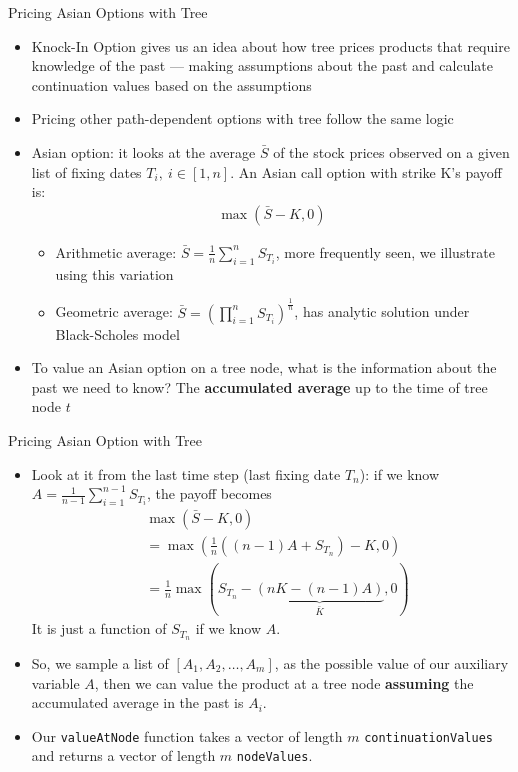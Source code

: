 \begin{frame}{Pricing Asian Options with Tree}
\begin{itemize}
\item Knock-In Option gives us an idea about how tree prices products that require knowledge of the past --- making assumptions about the past and calculate continuation values based on the assumptions
\item Pricing other path-dependent options with tree follow the same logic
\item Asian option: it looks at the average $\bar S$ of the stock prices observed on a given list of fixing dates $T_i, ~i \in [1, n]$. An Asian call option with strike K's payoff is:
\begin{align}
\max\left(\bar S - K, 0 \right)
\end{align}
\vspace{-3mm}
\begin{itemize}
\item Arithmetic average: $\bar S = \frac1n \sum_{i = 1}^n S_{T_i}$, more frequently seen, we illustrate using this variation
\item Geometric average: $\bar S = (\prod_{i = 1}^n S_{T_i})^{\frac1n}$, has analytic solution under Black-Scholes model
\end{itemize}
\item To value an Asian option on a tree node, what is the information about the past we need to know?  \pause The \textbf{accumulated average} up to the time of tree node $t$
\end{itemize}
\end{frame}

\begin{frame}[fragile]{Pricing Asian Option with Tree}
\begin{itemize}
\item Look at it from the last time step (last fixing date $T_n$): if we know $A = \frac1{n-1}\sum_{i=1}^{n-1}S_{T_i}$, the payoff becomes
\begin{align*}
& \max\left(\bar S - K, 0 \right) \\
& = \max\left(\frac1n((n-1)A + S_{T_n}) - K, 0 \right) \\
& = \frac1n \max(S_{T_n} - \underbrace{(nK - (n-1)A)}_{\bar K}, 0)
\end{align*}
It is just a function of $S_{T_n}$ if we know $A$.
\item So, we sample a list of $[A_1, A_2, \ldots, A_m]$, as the possible value of our auxiliary variable $A$, then we can value the product at a tree node \textbf{assuming} the accumulated average in the past is $A_i$.
\item Our \verb+valueAtNode+ function takes a vector of length $m$ \verb_continuationValues_ and returns a vector of length $m$ \verb_nodeValues_.
\end{itemize}
\end{frame}

